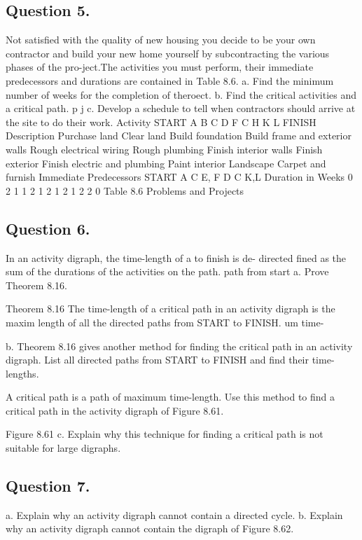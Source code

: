 \documentclass{article}
\begin{document}
\subsection{ Question 5. }
Not satisfied with the quality of new housing you decide to be your own contractor 
and build your new home yourself by subcontracting the various phases of the pro-ject.The activities you must perform, their immediate predecessors and durations 
are contained in Table 8.6. 
a. Find the minimum number of weeks for the completion of theroect. 
b. Find the critical activities and a critical path. p j 
c. Develop a schedule to tell when contractors should arrive at the site to do their 
work. 
Activity START A B C D F C H K L FINISH Description Purchase land Clear land Build foundation Build frame and exterior walls Rough electrical wiring Rough plumbing Finish interior walls Finish exterior Finish electric and plumbing Paint interior Landscape Carpet and furnish Immediate Predecessors START A C E, F D C K,L Duration in Weeks 0 2 1 1 2 1 2 1 2 1 2 2 0 Table 8.6 
Problems and Projects 
\subsection{Question 6.} In an activity digraph, the time-length of a to finish is de-
directed 
fined as the sum of the durations of the activities on the path. 
path from start 
a. Prove Theorem 8.16. 
\begin{framed}
Theorem 8.16 
The time-length of a critical path in an activity digraph is the maxim 
length of all the directed paths from START to FINISH. um time- 
\end{framed}



b. Theorem 8.16 gives another method for finding the critical path in an activity digraph. List all directed paths from START to FINISH and find their time-lengths. 

A critical path is a path of maximum time-length. Use this method to find a critical path in the activity digraph of Figure 8.61. 

Figure 8.61 
c. Explain why this technique for finding a critical path is not suitable for large digraphs. 

\subsection{Question 7.} a. Explain why an activity digraph cannot contain a directed cycle. 
b. Explain why an activity digraph cannot contain the digraph of Figure 8.62. 
\end{document}
